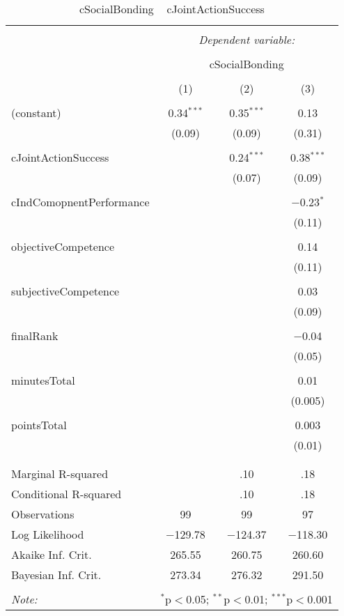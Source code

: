 
\begin{table}[!htbp] \centering 
  \caption{cSocialBonding ~ cJointActionSuccess} 
  \label{} 
\footnotesize 
\begin{tabular}{@{\extracolsep{5pt}}lccc} 
\\[-1.8ex]\hline 
\hline \\[-1.8ex] 
 & \multicolumn{3}{c}{\textit{Dependent variable:}} \\ 
\cline{2-4} 
\\[-1.8ex] & \multicolumn{3}{c}{cSocialBonding} \\ 
\\[-1.8ex] & (1) & (2) & (3)\\ 
\hline \\[-1.8ex] 
 (constant) & 0.34$^{***}$ & 0.35$^{***}$ & 0.13 \\ 
  & (0.09) & (0.09) & (0.31) \\ 
  & & & \\ 
 cJointActionSuccess &  & 0.24$^{***}$ & 0.38$^{***}$ \\ 
  &  & (0.07) & (0.09) \\ 
  & & & \\ 
 cIndComopnentPerformance &  &  & $-$0.23$^{*}$ \\ 
  &  &  & (0.11) \\ 
  & & & \\ 
 objectiveCompetence &  &  & 0.14 \\ 
  &  &  & (0.11) \\ 
  & & & \\ 
 subjectiveCompetence &  &  & 0.03 \\ 
  &  &  & (0.09) \\ 
  & & & \\ 
 finalRank &  &  & $-$0.04 \\ 
  &  &  & (0.05) \\ 
  & & & \\ 
 minutesTotal &  &  & 0.01 \\ 
  &  &  & (0.005) \\ 
  & & & \\ 
 pointsTotal &  &  & 0.003 \\ 
  &  &  & (0.01) \\ 
  & & & \\ 
\hline \\[-1.8ex] 
Marginal R-squared &  & .10 & .18 \\ 
Conditional R-squared &  & .10 & .18 \\ 
Observations & 99 & 99 & 97 \\ 
Log Likelihood & $-$129.78 & $-$124.37 & $-$118.30 \\ 
Akaike Inf. Crit. & 265.55 & 260.75 & 260.60 \\ 
Bayesian Inf. Crit. & 273.34 & 276.32 & 291.50 \\ 
\hline 
\hline \\[-1.8ex] 
\textit{Note:}  & \multicolumn{3}{r}{$^{*}$p$<$0.05; $^{**}$p$<$0.01; $^{***}$p$<$0.001} \\ 
\end{tabular} 
\end{table} 
